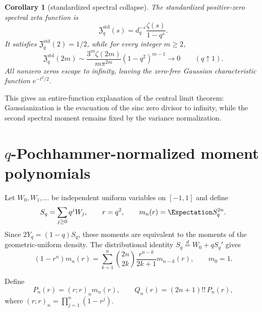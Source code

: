 \documentclass[11pt,oneside]{article}
\newtheorem{corollary}[theorem]{Corollary}
\theoremstyle{definition}
\theoremstyle{remark}
\begin{document}
\begin{corollary}[standardized spectral collapse]\label{cor:standardized-spectral}
The standardized positive-zero spectral zeta function is
\begin{equation}\label{eq:standardized-spectral-zeta}
 \mathfrak Z_q^{\mathrm{std}}(s)
 =d_q^{-s}\frac{\zeta(s)}{1-q^s}.
\end{equation}
It satisfies $\mathfrak Z_q^{\mathrm{std}}(2)=1/2$, while for every integer $m\ge2$,
\begin{equation}\label{eq:std-zeta-vanish}
 \mathfrak Z_q^{\mathrm{std}}(2m)
 \sim\frac{3^m\zeta(2m)}{m\pi^{2m}}(1-q^2)^{m-1}
 \longrightarrow0
 \qquad(q\uparrow1).
\end{equation}
All nonzero zeros escape to infinity, leaving the zero-free Gaussian characteristic function $e^{-t^2/2}$.
\end{corollary}

This gives an entire-function explanation of the central limit theorem: Gaussianization is the evacuation of the sinc zero divisor to infinity, while the second spectral moment remains fixed by the variance normalization.

\section{$q$-Pochhammer-normalized moment polynomials}
\label{sec:moment-polynomials}

Let $W_0,W_1,\ldots$ be independent uniform variables on $[-1,1]$ and define
\begin{equation}\label{eq:Sqr}
 S_q=\sum_{j\ge0}q^jW_j,
 \qquad r=q^2,
 \qquad m_n(r)=\Expectation S_q^{2n}.
\end{equation}
Since $2Y_q=(1-q)S_q$, these moments are equivalent to the moments of the geometric-uniform density.  The distributional identity $S_q\overset d=W_0+qS_q'$ gives
\begin{equation}\label{eq:moment-recurrence}
 (1-r^n)m_n(r)=
 \sum_{k=1}^n\binom{2n}{2k}\frac{r^{n-k}}{2k+1}m_{n-k}(r),
 \qquad m_0=1.
\end{equation}

Define
\begin{equation}\label{eq:PQ-def}
 P_n(r)=(r;r)_n m_n(r),
 \qquad
 Q_n(r)=(2n+1)!!\,P_n(r),
\end{equation}
where $(r;r)_n=\prod_{j=1}^n(1-r^j)$.
\end{document}
